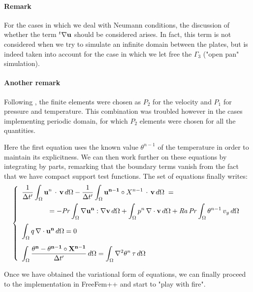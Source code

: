 \documentclass[12pt,oneside]{article}
\newcommand{\divergence}[1]{\nabla\cdot{#1}} 							%
\newcommand{\gradient}[1]{\nabla{#1}} 									%
\newcommand{\laplacian}[1]{\nabla^2{#1}} 								%
\newcommand\Pra{\mbox{\textit{Pr}}} 									%
\newcommand\Ray{\mbox{\textit{Ra}}}  									%
\newcommand\intO{\displaystyle\int_\Omega}								%
\begin{document}
\paragraph{Remark} For the cases in which we deal with Neumann conditions, the discussion of whether the term $^t\gradient{\bf{u}}$ should be considered arises. In fact, this term is not considered when we try to simulate an infinite domain between the plates, but is indeed taken into account for the case in which we let free the $\Gamma_3$ ("open pan" simulation).

\paragraph{Another remark} Following \cite{map559}, the finite elements were chosen as $P_2$ for the velocity and $P_1$ for pressure and temperature. This combination was troubled however in the cases implementing periodic domain, for which $P_2$ elements were chosen for all the quantities.


Here the first equation uses the known value $\theta^{n-1}$ of the temperature in order to maintain its explicitness. We can then work further on these equations by integrating by parts, remarking that the boundary terms vanish from the fact that we have compact support test functions. The set of equations finally writes:
\begin{equation}\left\{
\begin{array}{l}
\displaystyle\frac{1}{\Delta t'} \intO {\bf{u}}^n \, \cdot \, {\bf{v}} \, d\Omega - \displaystyle\frac{1}{\Delta t'} \intO {\bf{u}^{n-1}} \circ X^{n-1} \, \cdot \, {\bf{v}} \, d\Omega \; =\\[10pt] 
\qquad \qquad = - \Pra \intO \gradient{\bf{u}^n} : \gradient{\bf{v}} \, d\Omega + \intO p^n \, \divergence{\bf{v}} \, d\Omega + \Ray \, \Pra \intO \theta^{n-1} \, v_y \, d\Omega
\\[12pt]
\intO q \, \divergence{\bf{u}^n} \, d\Omega = 0 \\[14pt]
\intO \displaystyle\frac{\bf{\theta}^{n} - \bf{\theta}^{n-1} \circ X^{n-1} }{\Delta t'} \, d\Omega   = \intO \laplacian{\theta^n} \, \tau \, d\Omega
\end{array}\right.
\end{equation}


Once we have obtained the variational form of equations, we can finally proceed to the implementation in FreeFem++ and start to "play with fire".


\clearpage
\end{document}
